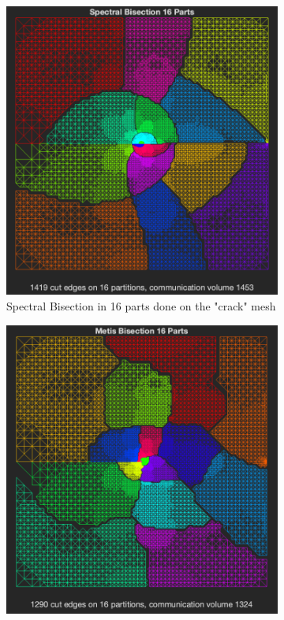\documentclass[unicode,11pt,a4paper,oneside,numbers=endperiod,openany]{scrartcl}
\begin{document}
    \begin{figure}[H]
        \centering
        \begin{subfigure}[b]{0.477\textwidth}
            \centering
            \includegraphics[width=\textwidth]{spec16.png}
            {{\small Spectral Bisection in 16 parts done on the "crack" mesh}}    
        \end{subfigure}
        \hfill
        \begin{subfigure}[b]{0.475\textwidth}  
            \centering 
            \includegraphics[width=\textwidth]{metis16.png}

\end{subfigure}
\end{figure}
\end{document}
